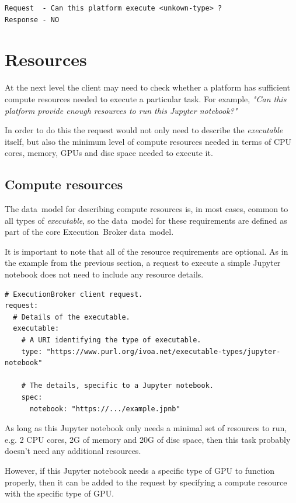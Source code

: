 \documentclass[11pt,a4paper]{ivoa}
\newcommand{\datamodel} {data~model}
\newcommand{\executionbroker} {Execution~Broker}
\newcommand{\jupyternotebook} {Jupyter notebook}
\newcommand{\executable} {\textit{executable}}
\newcommand{\cpu} {CPU}
\newcommand{\gpu} {GPU}
\begin{document}
\begin{lstlisting}[]
Request  - Can this platform execute <unkown-type> ?
Response - NO
\end{lstlisting}

\section{Resources}
\label{resources}

At the next level the client may need to check whether a platform has sufficient compute resources
needed to execute a particular task.
For example, \textit{"Can this platform provide enough resources to run this \jupyternotebook{}?"}

In order to do this the request would not only need to describe the \executable{} itself,
but also the minimum level of compute resources needed in terms of \cpu{} cores, memory, \gpu{}s
and disc space needed to execute it.

\subsection{Compute resources}
\label{compute-resources}

The \datamodel{} for describing compute resources is, in most cases, common to all types of \executable{},
so the \datamodel{} for these requirements are defined as part of the core \executionbroker{} \datamodel{}.

It is important to note that all of the resource requirements are optional.
As in the example from the previous section, a request to execute a simple \jupyternotebook{}
does not need to include any resource details.

\begin{lstlisting}[]
# ExecutionBroker client request.
request:
  # Details of the executable.
  executable:
    # A URI identifying the type of executable.
    type: "https://www.purl.org/ivoa.net/executable-types/jupyter-notebook"

    # The details, specific to a Jupyter notebook.
    spec:
      notebook: "https://.../example.jpnb"
\end{lstlisting}

As long as this \jupyternotebook{} only needs a minimal set of resources to run, e.g.
2 \cpu{} cores, 2G of memory and 20G of disc space, then this task probably doesn't need
any additional resources.

However, if this \jupyternotebook{} needs a specific type of \gpu{} to function properly,
then it can be added to the request by specifying a compute resource with the specific type
of \gpu{}.
\end{document}
